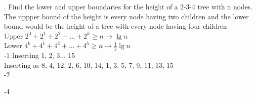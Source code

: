 \documentclass[12pt,largemargins]{homework}
\begin{document}
. Find the lower and upper boundaries for the height of a 2-3-4 tree with n nodes.\\
The uppper bound of the height is every node having two children and the lower bound would be the height of a tree with every node having four children\\
Upper $ 2^0 + 2^1 + 2^2 + ... + 2^h \geq n \rightarrow \lg n$ \\
Lower $ 4^0 + 4^1 + 4^2 + ... + 4^h \geq n \rightarrow \frac{1}{2} \lg n$\\
-1
Inserting {1, 2, 3... 15}\\
Inserting as {8, 4, 12, 2, 6, 10, 14, 1, 3, 5, 7, 9, 11, 13, 15}\\

-2

-4
\end{document}
